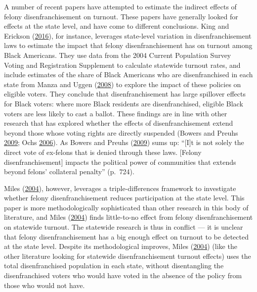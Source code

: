 \documentclass[
  12pt,
]{article}
\begin{document}
A number of recent papers have attempted to estimate the indirect effects of felony disenfranchisement on turnout. These papers have generally looked for effects at the state level, and have come to different conclusions. King and Erickson (\protect\hyperlink{ref-King2016}{2016}), for instance, leverages state-level variation in disenfranchisement laws to estimate the impact that felony disenfranchisement has on turnout among Black Americans. They use data from the 2004 Current Population Survey Voting and Registration Supplement to calculate statewide turnout rates, and include estimates of the share of Black Americans who are disenfranchised in each state from Manza and Uggen (\protect\hyperlink{ref-locked_out}{2008}) to explore the impact of these policies on eligible voters. They conclude that disenfranchisement has large spillover effects for Black voters: where more Black residents are disenfranchised, eligible Black voters are less likely to cast a ballot. These findings are in line with other research that has explored whether the effects of disenfranchisement extend beyond those whose voting rights are directly suspended (Bowers and Preuhs \protect\hyperlink{ref-Bowers2009}{2009}; Ochs \protect\hyperlink{ref-Ochs2006}{2006}). As Bowers and Preuhs (\protect\hyperlink{ref-Bowers2009}{2009}) sums up: ``{[}I{]}t is not solely the direct vote of ex-felons that is denied through these laws. {[}Felony disenfranchisement{]} impacts the political power of communities that extends beyond felons' collateral penalty'' (p.~724).

Miles (\protect\hyperlink{ref-Miles2004}{2004}), however, leverages a triple-differences framework to investigate whether felony disenfranchisement reduces participation at the state level. This paper is more methodologically sophisticated than other research in this body of literature, and Miles (\protect\hyperlink{ref-Miles2004}{2004}) finds little-to-no effect from felony disenfranchisement on statewide turnout. The statewide research is thus in conflict --- it is unclear that felony disenfranchisement has a big enough effect on turnout to be detected at the state level. Despite its methodological improves, Miles (\protect\hyperlink{ref-Miles2004}{2004}) (like the other literature looking for statewide disenfranchisement turnout effects) uses the total disenfranchised population in each state, without disentangling the disenfranchised voters who would have voted in the absence of the policy from those who would not have.
\end{document}
